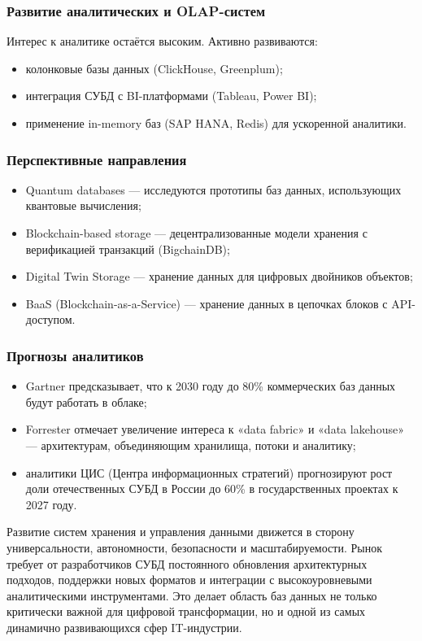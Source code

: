 \subsubsection{Развитие аналитических и OLAP-систем}

Интерес к аналитике остаётся высоким. Активно развиваются:
\begin{itemize}
	\item колонковые базы данных (ClickHouse, Greenplum);
	\item интеграция СУБД с BI-платформами (Tableau, Power BI);
	\item применение in-memory баз (SAP HANA, Redis) для ускоренной аналитики.
\end{itemize}

\subsubsection{Перспективные направления}

\begin{itemize}
	\item Quantum databases — исследуются прототипы баз данных, использующих квантовые вычисления;
	\item Blockchain-based storage — децентрализованные модели хранения с верификацией транзакций (BigchainDB);
	\item Digital Twin Storage — хранение данных для цифровых двойников объектов;
	\item BaaS (Blockchain-as-a-Service) — хранение данных в цепочках блоков с API-доступом.	
\end{itemize}

\subsubsection{Прогнозы аналитиков}

\begin{itemize}
	\item Gartner предсказывает, что к 2030 году до 80\% коммерческих баз данных будут работать в облаке;
	\item Forrester отмечает увеличение интереса к «data fabric» и «data lakehouse» — архитектурам, объединяющим хранилища, потоки и аналитику;
	\item аналитики ЦИС (Центра информационных стратегий) прогнозируют рост доли отечественных СУБД в России до 60\% в государственных проектах к 2027 году.	
\end{itemize}

Развитие систем хранения и управления данными движется в сторону универсальности, автономности, безопасности и масштабируемости. Рынок требует от разработчиков СУБД постоянного обновления архитектурных подходов, поддержки новых форматов и интеграции с высокоуровневыми аналитическими инструментами. Это делает область баз данных не только критически важной для цифровой трансформации, но и одной из самых динамично развивающихся сфер IT-индустрии.